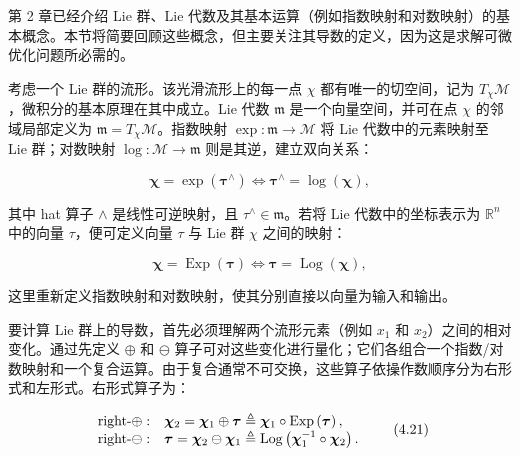 第 2 章已经介绍 Lie 群、Lie 代数及其基本运算（例如指数映射和对数映射）的基本概念。本节将简要回顾这些概念，但主要关注其导数的定义，因为这是求解可微优化问题所必需的。

考虑一个 Lie 群的流形。该光滑流形上的每一点 $\chi$ 都有唯一的切空间，记为 $T_{\chi}\mathcal{M}$，微积分的基本原理在其中成立。Lie 代数 $\mathfrak{m}$ 是一个向量空间，并可在点 $\chi$ 的邻域局部定义为 $\mathfrak{m} = T_{\chi}\mathcal{M}$。指数映射 $\exp: \mathfrak{m} \to \mathcal{M}$ 将 Lie 代数中的元素映射至 Lie 群；对数映射 $\log: \mathcal{M} \to \mathfrak{m}$ 则是其逆，建立双向关系：

\begin{equation}
\boldsymbol {\chi} = \exp (\boldsymbol {\tau} ^ {\wedge}) \Leftrightarrow \boldsymbol {\tau} ^ {\wedge} = \log (\boldsymbol {\chi}),\tag{4.19}
\end{equation}

其中 hat 算子 $\wedge$ 是线性可逆映射，且 $\tau ^ { \wedge } \in \mathfrak { m }$。若将 Lie 代数中的坐标表示为 $\mathbb { R } ^ { n }$ 中的向量 $\tau$，便可定义向量 $\tau$ 与 Lie 群 $\chi$ 之间的映射：

\begin{equation}
\boldsymbol {\chi} = \operatorname{Exp} (\boldsymbol {\tau}) \Leftrightarrow \boldsymbol {\tau} = \operatorname{Log} (\boldsymbol {\chi}),\tag{4.20}
\end{equation}

这里重新定义指数映射和对数映射，使其分别直接以向量为输入和输出。

要计算 Lie 群上的导数，首先必须理解两个流形元素（例如 $x _ { 1 }$ 和 $x _ { 2 }$）之间的相对变化。通过先定义 $\oplus$ 和 $\ominus$ 算子可对这些变化进行量化；它们各组合一个指数/对数映射和一个复合运算。由于复合通常不可交换，这些算子依操作数顺序分为右形式和左形式。右形式算子为：

\begin{equation}
\begin{array}{l l} \text {right-} \oplus : & \boldsymbol {\chi} _ {2} = \boldsymbol {\chi} _ {1} \oplus \boldsymbol {\tau} \triangleq \boldsymbol {\chi} _ {1} \circ \operatorname{Exp} \left(\boldsymbol {\tau}\right), \\ \text {right-} \ominus : & \boldsymbol {\tau} = \boldsymbol {\chi} _ {2} \ominus \boldsymbol {\chi} _ {1} \triangleq \operatorname{Log} \left(\boldsymbol {\chi} _ {1} ^ {- 1} \circ \boldsymbol {\chi} _ {2}\right). \end{array}\tag{4.21}
\end{equation}

